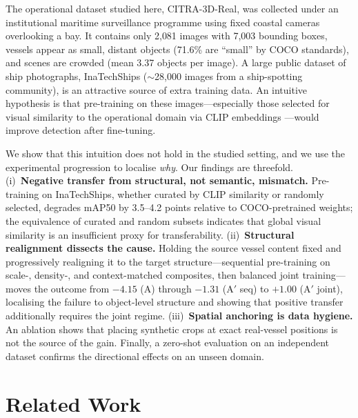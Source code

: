 \documentclass[10pt,conference]{IEEEtran}
\begin{document}
The operational dataset studied here, CITRA-3D-Real, was collected under an
institutional maritime surveillance programme using fixed coastal cameras
overlooking a bay. It contains only 2{,}081 images with 7{,}003 bounding boxes,
vessels appear as small, distant objects (71.6\% are ``small'' by COCO
standards), and scenes are crowded (mean 3.37 objects per image). A large public
dataset of ship photographs, InaTechShips \cite{teixeira2025inatechships}
($\sim$28{,}000 images from a ship-spotting community), is an attractive source
of extra training data. An intuitive hypothesis is that pre-training on these
images---especially those selected for visual similarity to the operational
domain via CLIP embeddings \cite{radford2021learning}---would improve detection after
fine-tuning.

We show that this intuition does not hold in the studied setting, and we use the
experimental progression to localise \emph{why}. Our findings are threefold.
(i)~\textbf{Negative transfer from structural, not semantic, mismatch.}
Pre-training on InaTechShips, whether curated by CLIP similarity or randomly
selected, degrades mAP50 by 3.5--4.2 points relative to COCO-pretrained weights;
the equivalence of curated and random subsets indicates that global visual
similarity is an insufficient proxy for transferability.
(ii)~\textbf{Structural realignment dissects the cause.} Holding the source
vessel content fixed and progressively realigning it to the target
structure---sequential pre-training on scale-, density-, and context-matched
composites, then balanced joint training---moves the outcome from $-4.15$ (A)
through $-1.31$ (A$'$ seq) to $+1.00$ (A$'$ joint), localising the failure to
object-level structure and showing that positive transfer additionally requires
the joint regime. (iii)~\textbf{Spatial anchoring is data hygiene.} An ablation
shows that placing synthetic crops at exact real-vessel positions is not the
source of the gain. Finally, a zero-shot evaluation on an independent dataset
confirms the directional effects on an unseen domain.

\section{Related Work}
\end{document}
